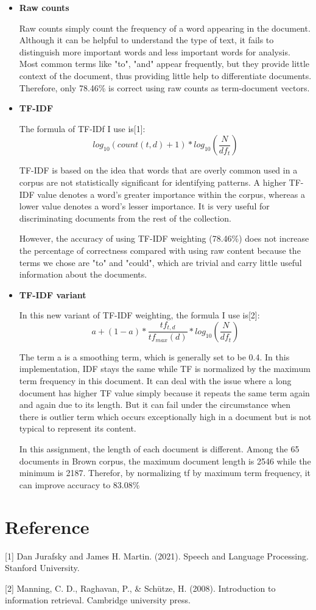 \documentclass{article}
\begin{document}
\begin{itemize}
  \item \textbf{\large{Raw counts}}

Raw counts simply count the frequency of a word appearing in the document. Although it can be helpful to understand the type of text, it fails to distinguish more important words and less important words for analysis. Most common terms like "to", "and" appear frequently, but they provide little context of the document, thus providing little help to differentiate documents. Therefore, only 78.46\% is correct using raw counts as term-document vectors.   
\newline

  \item \textbf{\large{TF-IDF}}

The formula of TF-IDf I use is[1]: 
$$log_{10}(count(t,d)+1) * log_{10}(\frac{N}{df_t})$$

TF-IDF is based on the idea that words that are overly common used in a corpus are not statistically significant for identifying patterns. A higher TF-IDF value denotes a word's greater importance within the corpus, whereas a lower value denotes a word's lesser importance. It is very useful for discriminating documents from the rest of the collection.

However, the accuracy of using TF-IDF weighting (78.46\%) does not increase the percentage of correctness compared with using raw content because the terms we chose are "to" and "could", which are trivial and carry little useful information about the documents. 
\newline

  \item \textbf{\large{TF-IDF variant}}

In this new variant of TF-IDF weighting, the formula I use is[2]: 
$$
a + (1-a)*\frac{tf_{t,d}}{tf_{max}(d)} * log_{10}(\frac{N}{df_t})
$$

The term a is a smoothing term, which is generally set to be 0.4. In this implementation, IDF stays the same while TF is normalized by the maximum term frequency in this document. It can deal with the issue where a long document has higher TF value simply because it repeats the same term again and again due to its length. But it can fail under the circumstance when there is outlier term which occurs exceptionally high in a document but is not typical to represent its content.

In this assignment, the length of each document is different. Among the 65 documents in Brown corpus, the maximum document length is 2546 while the minimum is 2187. Therefor, by normalizing tf by maximum term frequency, it can improve accuracy to 83.08\%

\end{itemize}
\newline

\section{Reference}

[1] Dan Jurafsky and James H. Martin. (2021). Speech and Language Processing. Stanford University.

[2] Manning, C. D., Raghavan, P., & Schütze, H. (2008). Introduction to information retrieval. Cambridge university press.
\end{document}
